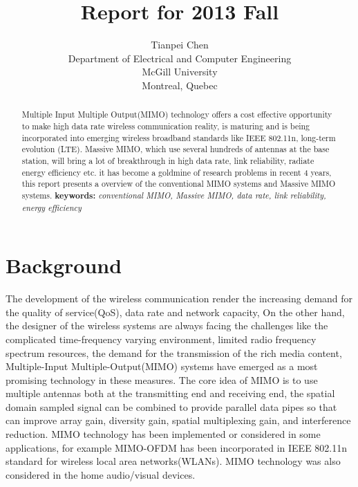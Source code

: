 \documentclass[conference]{IEEEtran}
\title{Report for 2013 Fall}
\author{Tianpei Chen\\
\small Department of Electrical and Computer Engineering\\
\small McGill University\\
\small Montreal, Quebec}
\begin{document}
\maketitle
\begin{abstract}
Multiple Input Multiple Output(MIMO) technology offers a cost effective opportunity to make high data rate wireless communication reality, is maturing and is being incorporated into emerging wireless broadband standards like IEEE 802.11n, long-term evolution (LTE)\cite{1}. Massive MIMO, which use several hundreds of antennas at the base station, will bring a lot of breakthrough in high data rate, link reliability, radiate energy efficiency etc\cite{7}. it has become a goldmine of research problems in recent 4 years, this report presents a overview of the conventional MIMO systems and Massive MIMO systems.\newline
\textbf{keywords: }\emph{conventional MIMO, Massive MIMO, data rate, link reliability, energy efficiency}\newpage
\end{abstract}
\section{Background}
The development of the wireless communication render the increasing demand for the quality of service(QoS), data rate and network capacity, On the other hand, the designer of the wireless systems are always facing the challenges like the complicated time-frequency varying environment, limited radio frequency spectrum resources, the demand for the transmission of the rich media content, Multiple-Input Multiple-Output(MIMO) systems have emerged as a most promising technology in these measures.\newline
The core idea of MIMO is to use multiple antennas both at the transmitting end and receiving end, the spatial domain sampled signal can be combined to provide parallel data pipes so that can improve array gain, diversity gain, spatial multiplexing gain, and interference reduction.\newline
MIMO technology has been implemented or considered in some applications, for example MIMO-OFDM has been incorporated in IEEE 802.11n standard for wireless local area networks(WLANs)\cite{2}. MIMO technology was also considered in the home audio/visual devices\cite{3}.\newline
\end{document}
